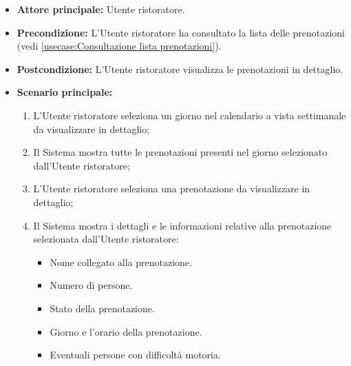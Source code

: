 \label{usecase:Dettaglio lista prenotazioni}
\begin{itemize}
	\item \textbf{Attore principale:} Utente ristoratore.

	\item \textbf{Precondizione:} L'Utente ristoratore ha consultato la lista delle prenotazioni (vedi \autoref{usecase:Consultazione lista prenotazioni}).

	\item \textbf{Postcondizione:} L'Utente ristoratore visualizza le prenotazioni in dettaglio.


	\item \textbf{Scenario principale:}
	      \begin{enumerate}
		      \item L'Utente ristoratore seleziona un giorno nel calendario a vista settimanale da visualizzare in dettaglio;
		      \item Il Sistema mostra tutte le prenotazioni presenti nel giorno selezionato dall'Utente ristoratore;
		      
		      \item L'Utente ristoratore seleziona una prenotazione da visualizzare in dettaglio;
		      \item Il Sistema mostra i dettagli e le informazioni relative alla prenotazione selezionata dall'Utente ristoratore:
		      \begin{itemize}
				\item Nome collegato alla prenotazione.
				\item Numero di persone.
				\item Stato della prenotazione.
				\item Giorno e l'orario della prenotazione.
				\item Eventuali persone con difficoltà motoria.
			  \end{itemize}

	      \end{enumerate}
\end{itemize}
